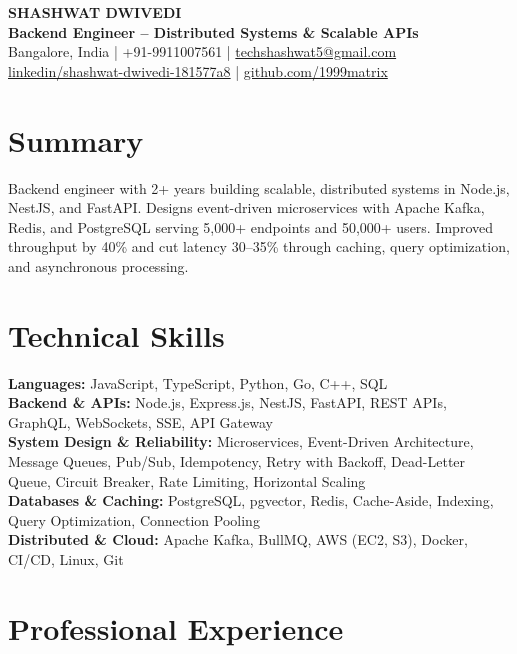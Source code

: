 \documentclass[10pt,letterpaper]{article}
\begin{document}
\begin{center}
    {\LARGE \textbf{SHASHWAT DWIVEDI}} \\[1pt]
    \textbf{Backend Engineer -- Distributed Systems \& Scalable APIs} \\[3pt]

    Bangalore, India
    \;|\;
    +91-9911007561
    \;|\;
    \href{mailto:techshashwat5@gmail.com}{techshashwat5@gmail.com} \\[1pt]
    \href{https://linkedin.com/in/shashwat-dwivedi-181577a8}{linkedin/shashwat-dwivedi-181577a8}
    \;|\;
    \href{https://github.com/1999matrix}{github.com/1999matrix}
\end{center}

\vspace{-5pt}

\section{Summary}
Backend engineer with 2+ years building scalable, distributed systems in Node.js, NestJS, and FastAPI. Designs event-driven microservices with Apache Kafka, Redis, and PostgreSQL serving 5,000+ endpoints and 50,000+ users. Improved throughput by 40\% and cut latency 30--35\% through caching, query optimization, and asynchronous processing.

\section{Technical Skills}

\textbf{Languages:} JavaScript, TypeScript, Python, Go, C++, SQL \\[1pt]
\textbf{Backend \& APIs:} Node.js, Express.js, NestJS, FastAPI, REST APIs, GraphQL, WebSockets, SSE, API Gateway \\[1pt]
\textbf{System Design \& Reliability:} Microservices, Event-Driven Architecture, Message Queues, Pub/Sub, Idempotency, Retry with Backoff, Dead-Letter Queue, Circuit Breaker, Rate Limiting, Horizontal Scaling \\[1pt]
\textbf{Databases \& Caching:} PostgreSQL, pgvector, Redis, Cache-Aside, Indexing, Query Optimization, Connection Pooling \\[1pt]
\textbf{Distributed \& Cloud:} Apache Kafka, BullMQ, AWS (EC2, S3), Docker, CI/CD, Linux, Git

\section{Professional Experience}
\end{document}
